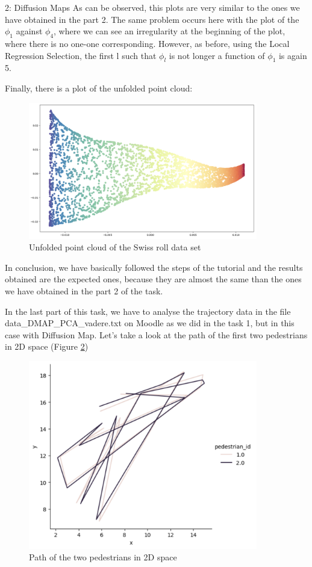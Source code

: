 \documentclass[10pt,a4paper]{article}
\begin{document}
\begin{task}{2: Diffusion Maps}
As can be observed, this plots are very similar to the ones we have obtained in the part 2. The same problem occurs here with the plot of the \(\phi_1\) against \(\phi_4\), where we can see an irregularity at the beginning of the plot, where there is no one-one corresponding. However, as before, using the Local Regression Selection, the first l such that \(\phi_l\) is not longer a function of \(\phi_1\) is again 5.

Finally, there is a plot of the unfolded point cloud:

\begin{figure} [H]
    \centering
    \includegraphics[width=10cm]{images/unfold.png}
    \caption{Unfolded point cloud of the Swiss roll data set}
    \label{fig:bonus-3}
\end{figure}

In conclusion, we have basically followed the steps of the tutorial and the results obtained are the expected ones, because they are almost the same than the ones we have obtained in the part 2 of the task.

\bigskip


In the last part of this task, we have to analyse the trajectory data in the file data\_DMAP\_PCA\_vadere.txt on Moodle as we did in the task 1, but in this case with Diffusion Map. Let's take a look at the path of the first two pedestrians in 2D space (Figure \ref{fig:task2-3-1})

\begin{figure} [H]
    \centering
    \includegraphics[width=10cm]{images/2d_plot.png}
    \caption{Path of the two pedestrians in 2D space}
    \label{fig:task2-3-1}
\end{figure}


\end{task}
\end{document}
